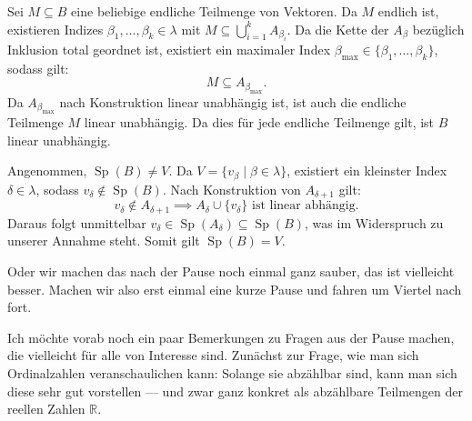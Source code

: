 \begin{math-stroke}

\begin{short-proof}
Sei $M \subseteq B$ eine beliebige endliche Teilmenge von Vektoren. Da $M$ endlich ist, existieren Indizes $\beta_1, \dots, \beta_k \in \lambda$ mit $M \subseteq \bigcup_{i=1}^k A_{\beta_i}$. Da die Kette der $A_\beta$ bezüglich Inklusion total geordnet ist, existiert ein maximaler Index $\beta_{\max} \in \{\beta_1, \dots, \beta_k\}$, sodass gilt:
\[
M \subseteq A_{\beta_{\max}}.
\]
Da $A_{\beta_{\max}}$ nach Konstruktion linear unabhängig ist, ist auch die endliche Teilmenge $M$ linear unabhängig. Da dies für jede endliche Teilmenge gilt, ist $B$ linear unabhängig.
\end{short-proof}


\begin{short-proof}
Angenommen, $\operatorname{Sp}(B) \neq V$. Da $V = \{v_\beta \mid \beta \in \lambda\}$, existiert ein kleinster Index $\delta \in \lambda$, sodass $v_\delta \notin \operatorname{Sp}(B)$.
Nach Konstruktion von $A_{\delta+1}$ gilt:
\[
v_\delta \notin A_{\delta+1} \implies A_{\delta} \cup \{v_\delta\} \text{ ist linear abhängig}.
\]
Daraus folgt unmittelbar $v_\delta \in \operatorname{Sp}(A_\delta) \subseteq \operatorname{Sp}(B)$, was im Widerspruch zu unserer Annahme steht. Somit gilt $\operatorname{Sp}(B) = V$.
\end{short-proof}
\end{math-stroke}

\begin{spoken-clean}[00:49:55 - 00:52:10]
Oder wir machen das nach der Pause noch einmal ganz sauber, das ist vielleicht besser. Machen wir also erst einmal eine kurze Pause und fahren um Viertel nach fort.

Ich möchte vorab noch ein paar Bemerkungen zu Fragen aus der Pause machen, die vielleicht für alle von Interesse sind. Zunächst zur Frage, wie man sich Ordinalzahlen veranschaulichen kann: Solange sie abzählbar sind, kann man sich diese sehr gut vorstellen --- und zwar ganz konkret als abzählbare Teilmengen der reellen Zahlen $\mathbb{R}$.
\end{spoken-clean}

